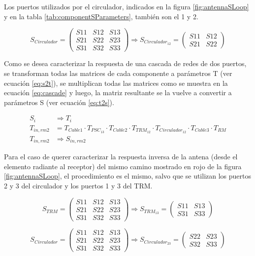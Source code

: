 Los puertos utilizados por el circulador, indicados en la figura \ref{fig:antennaSLoop} y en la tabla \ref{tab:componentSParameters},
también son el 1 y 2. 

$$
	S_{Circulador} = \begin{pmatrix} S11&S12&S13 \\ S21&S22&S23 \\ S31&S32&S33\end{pmatrix} \Rightarrow
	S_{Circulador_{12}} = \begin{pmatrix} S11&S12 \\ S21&S22 \end{pmatrix}
$$

Como se desea caracterizar la respuesta de una cascada de redes de dos puertos, se transforman todas las matrices de cada
componente a parámetros T (ver ecuación \ref{eq:s2t}), se multiplican todas las matrices como se muestra en la ecuación
\ref{eq:cascade} y luego, la matriz resultante se la vuelve a convertir a parámetros S (ver ecuación \ref{eq:t2s}).

$$
\begin{aligned}
	S_i &\Rightarrow T_i \\
	T_{in,rm2} &= T_{Cable1}\cdot T_{PSC_{13}}\cdot T_{Cable2}\cdot T_{TRM_{12}}\cdot T_{Circulador_{12}}\cdot T_{Cable3}\cdot T_{RM}\\
	T_{in,rm2} &\Rightarrow S_{in,rm2}
\end{aligned}
$$

Para el caso de querer caracterizar la respuesta inversa de la antena (desde el elemento radiante al receptor) del mismo camino
mostrado en rojo de la figura \ref{fig:antennaSLoop}, el procedimiento es el mismo, salvo que se utilizan los puertos 2 y 3 del
circulador y los puertos 1 y 3 del TRM.

$$
	S_{TRM} = \begin{pmatrix} S11&S12&S13 \\ S21&S22&S23 \\ S31&S32&S33\end{pmatrix} \Rightarrow
	S_{TRM_{13}} = \begin{pmatrix} S11&S13 \\ S31&S33 \end{pmatrix}
$$

$$
	S_{Circulador} = \begin{pmatrix} S11&S12&S13 \\ S21&S22&S23 \\ S31&S32&S33\end{pmatrix} \Rightarrow
	S_{Circulador_{23}} = \begin{pmatrix} S22&S23 \\ S32&S33 \end{pmatrix}
$$

